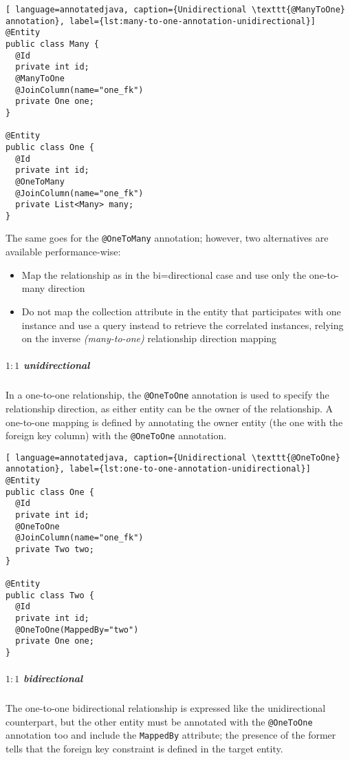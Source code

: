 \documentclass[english]{article}
\begin{document}
\begin{lstlisting}[ language=annotatedjava, caption={Unidirectional \texttt{@ManyToOne} annotation}, label={lst:many-to-one-annotation-unidirectional}]
@Entity
public class Many {
  @Id
  private int id;
  @ManyToOne
  @JoinColumn(name="one_fk")
  private One one;
}

@Entity
public class One {
  @Id
  private int id;
  @OneToMany
  @JoinColumn(name="one_fk")
  private List<Many> many;
}
\end{lstlisting}

The same goes for the \texttt{@OneToMany} annotation;
however, two alternatives are available performance-wise:

\begin{itemize}
  \item Map the relationship as in the bi=directional case and use only the one-to-many direction
  \item Do not map the collection attribute in the entity that participates with one instance and use a query instead to retrieve the correlated instances, relying on the inverse \textit{(many-to-one)} relationship direction mapping
\end{itemize}

\subparagraph*{\(1:1\) unidirectional}
In a one-to-one relationship, the \texttt{@OneToOne} annotation is used to specify the relationship direction, as either entity can be the owner of the relationship.
A one-to-one mapping is defined by annotating the owner entity (the one with the foreign key column) with the \texttt{@OneToOne} annotation.

\begin{lstlisting}[ language=annotatedjava, caption={Unidirectional \texttt{@OneToOne} annotation}, label={lst:one-to-one-annotation-unidirectional}]
@Entity
public class One {
  @Id
  private int id;
  @OneToOne
  @JoinColumn(name="one_fk")
  private Two two;
}

@Entity
public class Two {
  @Id
  private int id;
  @OneToOne(MappedBy="two")
  private One one;
}
\end{lstlisting}

\subparagraph*{\(1:1\) bidirectional}
The one-to-one bidirectional relationship is expressed like the unidirectional counterpart, but the other entity must be annotated with the \texttt{@OneToOne} annotation too and include the \texttt{MappedBy} attribute;
the presence of the former tells \jpa that the foreign key constraint is defined in the target entity.
\end{document}
